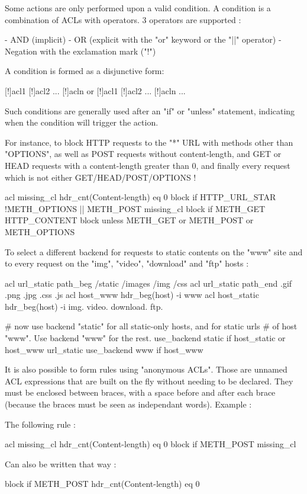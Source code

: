 Some actions are only performed upon a valid condition. A condition is a
combination of ACLs with operators. 3 operators are supported :

  - AND (implicit)
  - OR  (explicit with the "or" keyword or the "||" operator)
  - Negation with the exclamation mark ("!")

A condition is formed as a disjunctive form:

   [!]acl1 [!]acl2 ... [!]acln  { or [!]acl1 [!]acl2 ... [!]acln } ...

Such conditions are generally used after an "if" or "unless" statement,
indicating when the condition will trigger the action.

For instance, to block HTTP requests to the "*" URL with methods other than
"OPTIONS", as well as POST requests without content-length, and GET or HEAD
requests with a content-length greater than 0, and finally every request which
is not either GET/HEAD/POST/OPTIONS !

   acl missing_cl hdr_cnt(Content-length) eq 0
   block if HTTP_URL_STAR !METH_OPTIONS || METH_POST missing_cl
   block if METH_GET HTTP_CONTENT
   block unless METH_GET or METH_POST or METH_OPTIONS

To select a different backend for requests to static contents on the "www" site
and to every request on the "img", "video", "download" and "ftp" hosts :

   acl url_static  path_beg         /static /images /img /css
   acl url_static  path_end         .gif .png .jpg .css .js
   acl host_www    hdr_beg(host) -i www
   acl host_static hdr_beg(host) -i img. video. download. ftp.

   # now use backend "static" for all static-only hosts, and for static urls
   # of host "www". Use backend "www" for the rest.
   use_backend static if host_static or host_www url_static
   use_backend www    if host_www

It is also possible to form rules using "anonymous ACLs". Those are unnamed ACL
expressions that are built on the fly without needing to be declared. They must
be enclosed between braces, with a space before and after each brace (because
the braces must be seen as independant words). Example :

   The following rule :

       acl missing_cl hdr_cnt(Content-length) eq 0
       block if METH_POST missing_cl

   Can also be written that way :

       block if METH_POST { hdr_cnt(Content-length) eq 0 }

